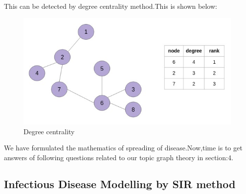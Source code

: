\documentclass[12pt]{article}
\begin{document}
\par This can be detected by degree centrality method.This is shown below:\\
\begin{figure}[H]
\includegraphics[width=10 cm,height=10 cm]{Centrality_3.jpeg}
\caption{Degree centrality\cite{nj5}} 
\end{figure}

\par We have formulated the mathematics of spreading of disease.Now,time is to get answers of following questions related to our topic graph theory in section:4.
\newpage


\subsection{Infectious Disease Modelling by SIR method}
\end{document}
